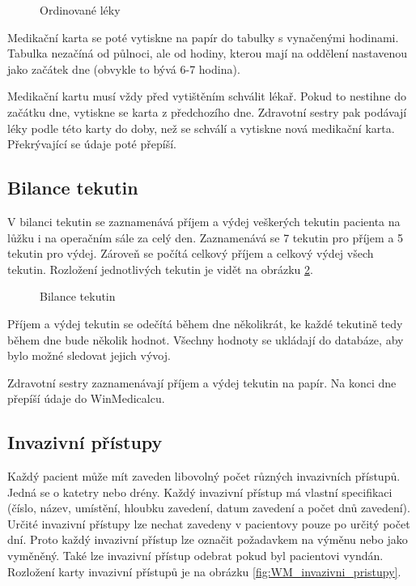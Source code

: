 \begin{figure}[h]
	\centering
	\caption{Ordinované léky}
  \label{fig:WM_ordinovane_leky}
\end{figure}

Medikační karta se poté vytiskne na papír do tabulky s vynačenými hodinami. Tabulka nezačíná od půlnoci, ale od hodiny, kterou mají na oddělení nastavenou jako začátek dne (obvykle to bývá 6-7 hodina).

Medikační kartu musí vždy před vytištěním schválit lékař. Pokud to nestihne do začátku dne, vytiskne se karta z předchozího dne. Zdravotní sestry pak podávají léky podle této karty do doby, než se schválí a vytiskne nová medikační karta. Překrývající se údaje poté přepíší.

\subsection{Bilance tekutin}

V bilanci tekutin se zaznamenává příjem a výdej veškerých tekutin pacienta na lůžku i na operačním sále za celý den. Zaznamenává se 7 tekutin pro příjem a 5 tekutin pro výdej. Zároveň se počítá celkový příjem a celkový výdej všech tekutin. Rozložení jednotlivých tekutin je vidět na obrázku \ref{fig:WM_bilance_tekutin}.

\begin{figure}[h]
	\centering
	\caption{Bilance tekutin}
  \label{fig:WM_bilance_tekutin}
\end{figure}


Příjem a výdej tekutin se odečítá během dne několikrát, ke každé tekutině tedy během dne bude několik hodnot. Všechny hodnoty se ukládají do databáze, aby bylo možné sledovat jejich vývoj.

Zdravotní sestry zaznamenávají příjem a výdej tekutin na papír. Na konci dne přepíší údaje do WinMedicalcu.

\subsection{Invazivní přístupy}

Každý pacient může mít zaveden libovolný počet různých invazivních přístupů. Jedná se o katetry nebo drény. Každý invazivní přístup má vlastní specifikaci (číslo, název, umístění, hloubku zavedení, datum zavedení a počet dnů zavedení). Určité invazivní přístupy lze nechat zavedeny v pacientovy pouze po určitý počet dní. Proto každý invazivní přístup lze označit požadavkem na výměnu nebo jako vyměněný. Také lze invazivní přístup odebrat pokud byl pacientovi vyndán. Rozložení karty invazivní přístupů je na obrázku \ref{fig:WM_invazivni_pristupy}.

